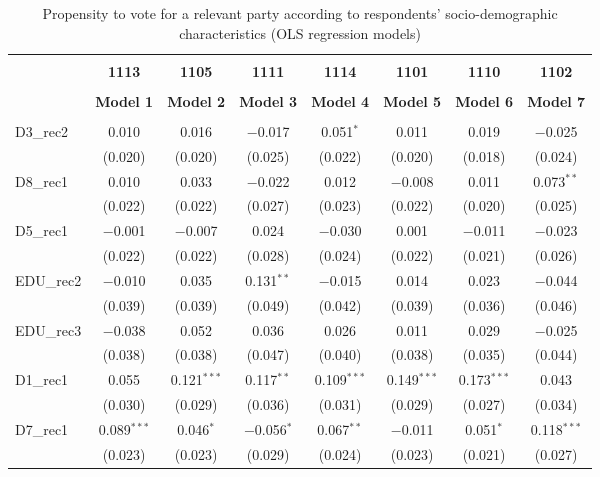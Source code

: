 \documentclass[
]{article}
\begin{document}
\begin{table}[!htbp] \centering 
  \caption{Propensity to vote for a relevant party according to respondents' 
                     socio-demographic characteristics (OLS regression models)} 
  \label{table:full_ols_fr} 
\begin{tabular}{@{\extracolsep{5pt}}lccccccc} 
\\[-1.8ex]\hline \\[-1.8ex] 
 & \textbf{1113} & \textbf{1105} & \textbf{1111} & \textbf{1114} & \textbf{1101} & \textbf{1110} & \textbf{1102} \\ 
\\[-1.8ex] & \textbf{Model 1} & \textbf{Model 2} & \textbf{Model 3} & \textbf{Model 4} & \textbf{Model 5} & \textbf{Model 6} & \textbf{Model 7}\\ 
\hline \\[-1.8ex] 
 D3\_rec2 & 0.010 & 0.016 & $-$0.017 & 0.051$^{*}$ & 0.011 & 0.019 & $-$0.025 \\ 
  & (0.020) & (0.020) & (0.025) & (0.022) & (0.020) & (0.018) & (0.024) \\ 
  D8\_rec1 & 0.010 & 0.033 & $-$0.022 & 0.012 & $-$0.008 & 0.011 & 0.073$^{**}$ \\ 
  & (0.022) & (0.022) & (0.027) & (0.023) & (0.022) & (0.020) & (0.025) \\ 
  D5\_rec1 & $-$0.001 & $-$0.007 & 0.024 & $-$0.030 & 0.001 & $-$0.011 & $-$0.023 \\ 
  & (0.022) & (0.022) & (0.028) & (0.024) & (0.022) & (0.021) & (0.026) \\ 
  EDU\_rec2 & $-$0.010 & 0.035 & 0.131$^{**}$ & $-$0.015 & 0.014 & 0.023 & $-$0.044 \\ 
  & (0.039) & (0.039) & (0.049) & (0.042) & (0.039) & (0.036) & (0.046) \\ 
  EDU\_rec3 & $-$0.038 & 0.052 & 0.036 & 0.026 & 0.011 & 0.029 & $-$0.025 \\ 
  & (0.038) & (0.038) & (0.047) & (0.040) & (0.038) & (0.035) & (0.044) \\ 
  D1\_rec1 & 0.055 & 0.121$^{***}$ & 0.117$^{**}$ & 0.109$^{***}$ & 0.149$^{***}$ & 0.173$^{***}$ & 0.043 \\ 
  & (0.030) & (0.029) & (0.036) & (0.031) & (0.029) & (0.027) & (0.034) \\ 
  D7\_rec1 & 0.089$^{***}$ & 0.046$^{*}$ & $-$0.056$^{*}$ & 0.067$^{**}$ & $-$0.011 & 0.051$^{*}$ & 0.118$^{***}$ \\ 
  & (0.023) & (0.023) & (0.029) & (0.024) & (0.023) & (0.021) & (0.027) \\ 

\end{tabular}
\end{table}
\end{document}
